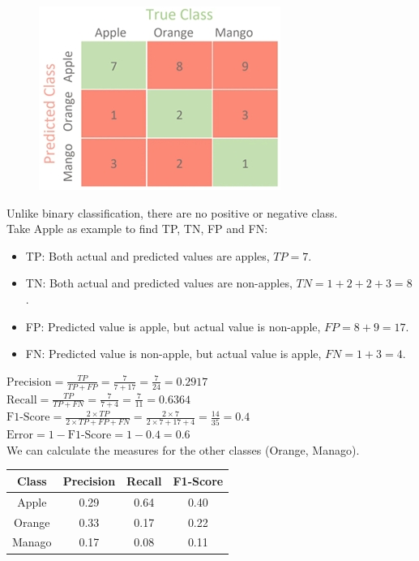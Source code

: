 \documentclass{book}
\begin{document}
\begin{figure}
    \centering
    \includegraphics[scale=0.55]{chapter 4/ch4_figure5.jpeg}
\end{figure}

Unlike binary classification, there are no positive or negative class.\\
Take Apple as example to find TP, TN, FP and FN:\\
\begin{itemize}
    \item TP: Both actual and predicted values are apples, \(TP = 7\).
    \item TN: Both actual and predicted values are non-apples, \(TN = 1+2+2+3=8\).
    \item FP: Predicted value is apple, but actual value is non-apple, \(FP = 8+9=17\).
    \item FN: Predicted value is non-apple, but actual value is apple, \(FN = 1+3=4\).
\end{itemize}
\(\text{Precision} = \frac{TP}{TP + FP} = \frac{7}{7+17} = \frac{7}{24} = 0.2917\)\\
\vspace{1mm}
\(\text{Recall} = \frac{TP}{TP + FN} = \frac{7}{7+4} = \frac{7}{11} = 0.6364\)\\
\vspace{1mm}
\(\text{F1-Score} = \frac{2 \times TP}{2 \times TP + FP + FN} = \frac{2 \times 7}{2 \times 7 + 17 + 4} = \frac{14}{35} = 0.4\)\\
\vspace{1mm}
\(\text{Error} = 1 - \text{F1-Score} = 1 - 0.4 = 0.6\)\\
We can calculate the measures for the other classes (Orange, Manago).
\begin{center}
    \begin{tabular}{|c|c|c|c|}
        \hline
        \rowcolor{lightblue}
        \textbf{Class} & \textbf{Precision} & \textbf{Recall} & \textbf{F1-Score} \\
        \hline
        Apple & 0.29 & 0.64 & 0.40 \\
        \hline
        Orange & 0.33 & 0.17 & 0.22 \\
        \hline
        Manago & 0.17 & 0.08 & 0.11 \\
        \hline
    \end{tabular}
\end{center}
\end{document}
